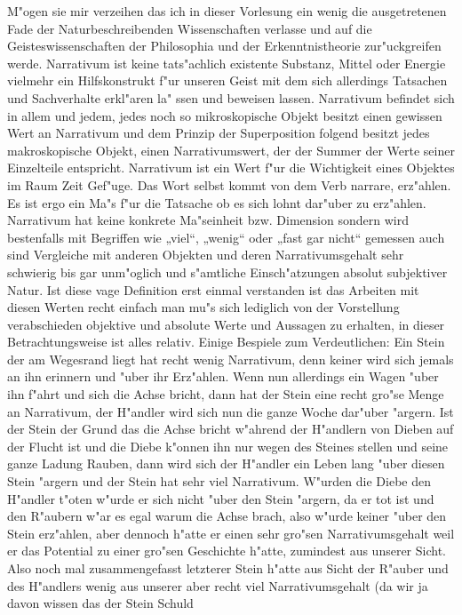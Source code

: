 \documentclass[a5paper,8pt]{book}
\begin{document}
M"ogen sie mir verzeihen das ich in dieser Vorlesung ein wenig die ausgetretenen Fade der Naturbeschreibenden Wissenschaften 
verlasse und auf die Geisteswissenschaften der Philosophia und der Erkenntnistheorie zur"uckgreifen werde.
Narrativum ist keine tats"achlich existente Substanz, Mittel oder Energie vielmehr ein Hilfskonstrukt f"ur unseren 
Geist mit dem sich allerdings Tatsachen und Sachverhalte erkl"aren la"
ssen und beweisen lassen. Narrativum befindet sich in allem und jedem, jedes noch so mikroskopische Objekt besitzt einen gewissen 
Wert an Narrativum und dem Prinzip der Superposition folgend besitzt jedes makroskopische Objekt, einen Narrativumswert, der der 
Summer der Werte seiner Einzelteile entspricht.
Narrativum ist ein Wert f"ur die Wichtigkeit eines Objektes im Raum Zeit Gef"uge. Das Wort selbst kommt von dem Verb narrare, 
erz"ahlen. Es ist ergo ein Ma"s f"ur die Tatsache ob es sich lohnt dar"uber zu erz"ahlen. Narrativum hat keine konkrete Ma"seinheit 
bzw. Dimension sondern wird bestenfalls mit Begriffen wie „viel“, „wenig“ oder „fast gar nicht“ gemessen auch sind Vergleiche mit 
anderen Objekten und deren Narrativumsgehalt sehr schwierig bis gar unm"oglich und s"amtliche Einsch"atzungen absolut subjektiver Natur.
Ist diese vage Definition erst einmal verstanden ist das Arbeiten mit diesen Werten recht einfach man mu"s sich lediglich von der 
Vorstellung verabschieden objektive und absolute Werte und Aussagen zu erhalten, in dieser Betrachtungsweise ist alles relativ.
Einige Bespiele zum Verdeutlichen:
Ein Stein der am Wegesrand liegt hat recht wenig Narrativum, denn keiner wird sich jemals an ihn erinnern und "uber ihr Erz"ahlen. 
Wenn nun allerdings ein Wagen "uber ihn f"ahrt und sich die Achse bricht, dann hat der Stein eine recht gro"se Menge an Narrativum, 
der H"andler wird sich nun die ganze Woche dar"uber "argern. Ist der Stein der Grund das die Achse bricht w"ahrend der H"andlern 
von Dieben auf der Flucht ist und die Diebe k"onnen ihn nur wegen des Steines stellen und seine ganze Ladung Rauben, dann wird sich 
der H"andler ein Leben lang "uber diesen Stein "argern und der Stein hat sehr viel Narrativum. W"urden die Diebe den H"andler t"oten 
w"urde er sich nicht "uber den Stein "argern, da er tot ist und den R"aubern w"ar es egal warum die Achse brach, also w"urde keiner 
"uber den Stein erz"ahlen, aber dennoch h"atte er einen sehr gro"sen Narrativumsgehalt weil er das Potential zu einer gro"sen Geschichte 
h"atte, zumindest aus unserer Sicht. Also noch mal zusammengefasst letzterer Stein h"atte aus 
Sicht der R"auber und des H"andlers wenig aus unserer aber recht viel Narrativumsgehalt (da wir ja davon wissen das der Stein Schuld 
\end{document}
